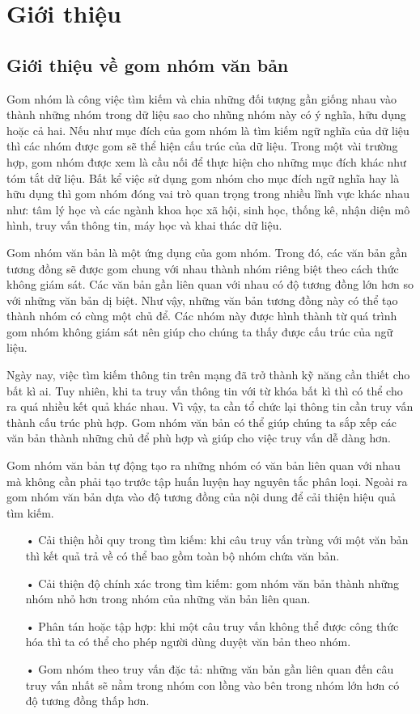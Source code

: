 \chapter{Giới thiệu}
\label{Chapter1}

\section{Giới thiệu về gom nhóm văn bản}

Gom nhóm là công việc tìm kiếm và chia những đối tượng gần giống nhau vào thành những nhóm trong dữ liệu sao cho nhũng nhóm này có ý nghĩa, hữu dụng hoặc cả hai. %
Nếu như mục đích của gom nhóm là tìm kiếm ngữ nghĩa của dữ liệu thì các nhóm được gom sẽ thể hiện cấu trúc của dữ liệu.
Trong một vài trường hợp, gom nhóm được xem là cầu nối để thực hiện cho những mục đích khác như tóm tắt dữ liệu.
Bất kể việc sử dụng gom nhóm cho mục đích ngữ nghĩa hay là hữu dụng thì gom nhóm đóng vai trò quan trọng trong nhiều lĩnh vực khác nhau như: tâm lý học và các ngành khoa học xã hội, sinh học, thống kê, nhận diện mô hình, truy vấn thông tin, máy học và khai thác dữ liệu.

Gom nhóm văn bản là một ứng dụng của gom nhóm.
Trong đó, các văn bản gần tương đồng sẽ được gom chung với nhau thành nhóm riêng biệt theo cách thức không giám sát.
Các văn bản gần liên quan với nhau có độ tương đồng lớn hơn so với những văn bản dị biệt.
Như vậy, những văn bản tương đồng này có thể tạo thành nhóm có cùng một chủ để.
Các nhóm này được hình thành từ quá trình gom nhóm không giám sát nên giúp cho chúng ta thấy được cấu trúc của ngữ liệu.

Ngày nay, việc tìm kiếm thông tin trên mạng đã trở thành kỹ năng cần thiết cho bất kì ai.
Tuy nhiên, khi ta truy vấn thông tin với từ khóa bất kì thì có thể cho ra quá nhiều kết quả khác nhau.
Vì vậy, ta cần tổ chức lại thông tin cần truy vấn thành cấu trúc phù hợp.
Gom nhóm văn bản có thể giúp chúng ta sắp xếp các văn bản thành những chủ để phù hợp và giúp cho việc truy vấn dễ dàng hơn.

Gom nhóm văn bản tự động tạo ra những nhóm có văn bản liên quan với nhau mà không cần phải tạo trước tập huấn luyện hay nguyên tắc phân loại.
Ngoài ra gom nhóm văn bản dựa vào độ tương đồng của nội dung để cải thiện hiệu quả tìm kiếm.
\begin{enumerate}
\item[•]Cải thiện hồi quy trong tìm kiếm: khi câu truy vấn trùng với một văn bản thì kết quả trả về có thể bao gồm toàn bộ nhóm chứa văn bản.
\item[•]Cải thiện độ chính xác trong tìm kiếm: gom nhóm văn bản thành những nhóm nhỏ hơn trong nhóm của những văn bản liên quan.
\item[•]Phân tán hoặc tập hợp: khi một câu truy vấn không thể được công thức hóa thì ta có thể cho phép người dùng duyệt văn bản theo nhóm.
\item[•]Gom nhóm theo truy vấn đặc tả: những văn bản gần liên quan đến câu truy vấn nhất sẽ nằm trong nhóm con lồng vào bên trong nhóm lớn hơn có độ tương đồng thấp hơn.
\end{enumerate}

